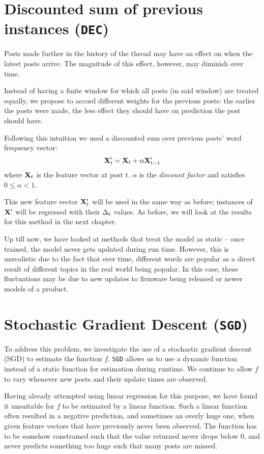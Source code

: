 \section{Discounted sum of previous instances (\texttt{DEC})}
 
Posts made further in the history of the thread may have an effect on when the 
latest posts arrive. The magnitude of this effect, however, may diminish over 
time.

Instead of having a finite window for which all posts (in said window) are 
treated equally, we propose to accord different weights for the previous posts: the earlier the posts were made, the less effect they should have on prediction 
the post should have.

Following this intuition we used a discounted sum over previous posts' word 
frequency vector:
\[
	\mathbf{X}'_t = \mathbf{X}_t + \alpha \mathbf{X}'_{t-1}
\]
where $\mathbf{X}_t$ is the feature vector at post $t$. $\alpha$ is the \emph{discount 
factor} and satisfies $0 \leq \alpha < 1$.

This new feature vector $\mathbf{X}'_t$ will be used in the same way as before; 
instances of $\mathbf{X}'$ will be regressed with their $\Delta_t$ values. As before, we will 
look at the results for this method in the next chapter.

Up till now, we have looked at methods that treat the model as static -- once 
trained, the model never gets updated during run time. However, this is 
unrealistic due to the fact that over time, different words are popular as a 
direct result of different topics in the real world being popular. In this case, 
these fluctuations may be due to new updates to firmware being released or newer 
models of a product.

\section{Stochastic Gradient Descent (\texttt{SGD})}
To address this problem, we investigate the use of a stochastic gradient descent 
(SGD) to estimate the function $f$.  \texttt{SGD} allows us to use a dynamic 
function instead of a static function for estimation during runtime.  We 
continue to allow $f$ to vary whenever new posts and their update times are 
observed.

Having already attempted using linear regression for this purpose, we have found 
it unsuitable for $f$ to be estimated by a linear function. Such a linear 
function often resulted in a negative prediction, and sometimes an 
overly huge one, when given feature vectors that have previously never been 
observed. The function has to be somehow constrained such that the value 
returned never drops below 0, and never predicts something too huge such that 
many posts are missed.


